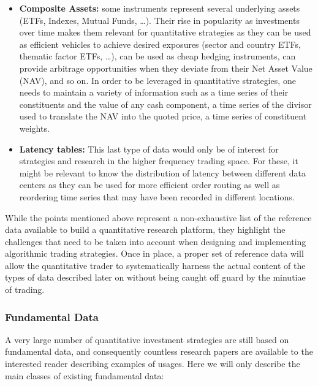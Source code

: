 \begin{itemize}
\item \textbf{Composite Assets:} some instruments represent several underlying assets (ETFs, Indexes, Mutual Funds, \dots). Their rise in popularity as investments over time makes them relevant for quantitative strategies as they can be used as efficient vehicles to achieve desired exposures (sector and country ETFs, thematic factor ETFs, \dots), can be used as cheap hedging instruments, can provide arbitrage opportunities when they deviate from their Net Asset Value (NAV), and so on. 
In order to be leveraged in quantitative strategies, one needs to maintain a variety of information such as a time series of their constituents and the value of any cash component, a time series of the divisor used to translate the NAV into the quoted price, a time series of constituent weights. 


\item \textbf{Latency tables:} This last type of data would only be of interest for strategies and research in the higher frequency trading space. For these, it might be relevant to know the distribution of latency between different data centers as they can be used for more efficient order routing as well as reordering time series that may have been recorded in different locations.

\end{itemize}

While the points mentioned above represent a non-exhaustive list of the reference data available to build a quantitative research platform, they highlight the challenges that need to be taken into account when designing and implementing algorithmic trading strategies. Once in place, a proper set of reference data will allow the quantitative trader to systematically harness the actual content of the types of data described later on without being caught off guard by the minutiae of trading.

\subsubsection{Fundamental Data}

A very large number of quantitative investment strategies are still based on fundamental data, and consequently countless research papers are available to the interested reader describing examples of usages. Here we will only describe the main classes of existing fundamental data:

